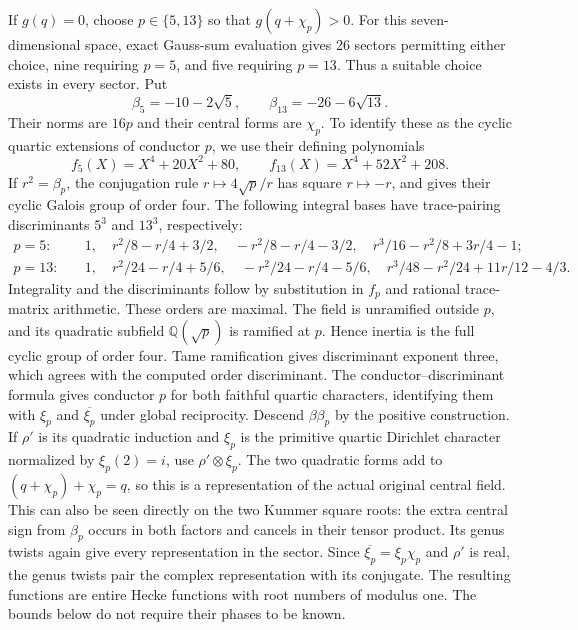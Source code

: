 If $g(q)=0$, choose $p\in\{5,13\}$ so that $g(q+\chi_p)>0$.
For this seven-dimensional space, exact Gauss-sum evaluation gives
26 sectors permitting either choice, nine requiring $p=5$, and five
requiring $p=13$. Thus a suitable choice exists in every sector. Put
\[
 \beta_5=-10-2\sqrt5,\qquad \beta_{13}=-26-6\sqrt{13}.
\]
Their norms are $16p$ and their central forms are $\chi_p$.
To identify these as the cyclic quartic extensions of conductor $p$,
we use their defining polynomials
\[
 f_5(X)=X^4+20X^2+80,\qquad f_{13}(X)=X^4+52X^2+208.
\]
If $r^2=\beta_p$, the conjugation rule $r\mapsto4\sqrt p/r$ has
square $r\mapsto-r$, and gives their cyclic Galois group of order four.
The following integral bases have trace-pairing discriminants $5^3$
and $13^3$, respectively:
\[
\begin{split}
 p=5:\quad &1,\quad r^2/8-r/4+3/2,\quad-r^2/8-r/4-3/2,\quad
 r^3/16-r^2/8+3r/4-1;\\
 p=13:\quad &1,\quad r^2/24-r/4+5/6,\quad-r^2/24-r/4-5/6,\quad
 r^3/48-r^2/24+11r/12-4/3.
\end{split}
\]
Integrality and the discriminants follow by substitution in $f_p$ and
rational trace-matrix arithmetic. These orders are maximal. The field is
unramified outside $p$, and its
quadratic subfield $\mathbb Q(\sqrt p)$ is ramified at $p$. Hence inertia
is the full cyclic group of order four. Tame ramification gives
discriminant exponent three, which agrees with the computed order
discriminant.
The conductor--discriminant formula gives conductor $p$ for both faithful
quartic characters, identifying them with $\xi_p$ and
$\overline{\xi_p}$ under global reciprocity.
Descend $\beta\beta_p$ by the positive construction. If $\rho'$ is
its quadratic induction and $\xi_p$ is the primitive quartic Dirichlet
character normalized by $\xi_p(2)=i$, use $\rho'\otimes\xi_p$.
The two quadratic forms add to
$(q+\chi_p)+\chi_p=q$, so this is a representation of the actual
original central field. This can also be seen directly on the two
Kummer square roots: the extra central sign from $\beta_p$ occurs
in both factors and cancels in their tensor product. Its genus twists
again give every representation in the sector. Since
$\overline{\xi_p}=\xi_p\chi_p$ and $\rho'$ is real, the genus twists
pair the complex representation with its conjugate. The resulting
functions are entire Hecke functions with root numbers of modulus one.
The bounds below do not require their phases to be known.

